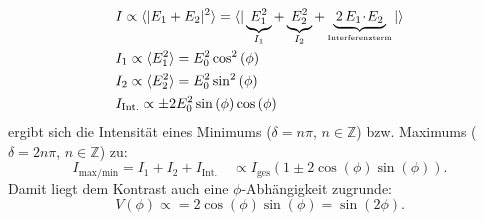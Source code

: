 \begin{align*}
	&	I 					 	\propto	 \langle |E_{1} + E_{2}|^2 \rangle = \langle |\underbrace{ \, E_{1}^2 \, }_{\substack{I_1}} + \underbrace{ \, E_{2}^2 \, }_{\substack{I_2}} + \underbrace{ \, 2 \, E_{1} \! \cdot \! E_{2} \, }_{\substack{\text{\tiny{Interferenzterm}}}} |\rangle \\
  	&	I_{1} 	\propto	 \langle E_1^2 \rangle = E_0^2  \cos^2{(\phi)}\\ %
	&	I_2 	\propto	 \langle E_2^2 \rangle = E_0^2  \sin^2{(\phi)} \\
	&	I_{\text{Int.}}	\propto	 \pm 2 E_0^2  \sin{(\phi)} \cos{(\phi)}\\
\end{align*}
ergibt sich die Intensität eines Minimums ($\delta = n \pi$, $n \in \mathbb{Z}$) bzw. Maximums ($\delta=2n\pi$, $n \in \mathbb{Z}$) zu:
\begin{equation*}
	I_{\text{max/min}} 	= I_1+I_2+I_{\text{Int.}} \quad \propto I_{\text{ges}} \left(1 \pm 2 \cos{(\phi)} \sin{(\phi)}\right).
	\label{eqn:intensity}
\end{equation*}
Damit liegt dem Kontrast auch eine $\phi$-Abhängigkeit zugrunde:
\begin{equation}
	V(\phi) \propto = 2 \cos{(\phi)} \sin{(\phi)} = \sin{(2\phi)}. %
	\label{eqn:kontrastmitwinkel}
\end{equation}

